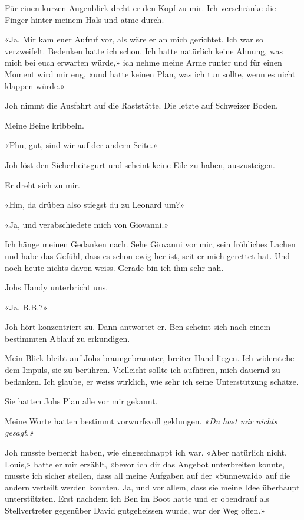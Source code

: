 Für einen kurzen Augenblick dreht er den Kopf zu mir. Ich verschränke
die Finger hinter meinem Hals und atme durch.

«Ja. Mir kam euer Aufruf vor, als wäre er an mich gerichtet. Ich war so
verzweifelt. Bedenken hatte ich schon. Ich hatte natürlich keine Ahnung,
was mich bei euch erwarten würde,» ich nehme meine Arme runter und für
einen Moment wird mir eng, «und hatte keinen Plan, was ich tun sollte,
wenn es nicht klappen würde.»

Joh nimmt die Ausfahrt auf die Raststätte. Die letzte auf Schweizer
Boden.

Meine Beine kribbeln.

«Phu, gut, sind wir auf der andern Seite.»

Joh löst den Sicherheitsgurt und scheint keine Eile zu haben,
auszusteigen.

Er dreht sich zu mir.

«Hm, da drüben also stiegst du zu Leonard um?»

«Ja, und verabschiedete mich von Giovanni.»

Ich hänge meinen Gedanken nach. Sehe Giovanni vor mir, sein fröhliches
Lachen und habe das Gefühl, dass es schon ewig her ist, seit er mich
gerettet hat. Und noch heute nichts davon weiss. Gerade bin ich ihm sehr
nah.

Johs Handy unterbricht uns.

«Ja, B.B.?»

Joh hört konzentriert zu. Dann antwortet er. Ben scheint sich nach einem
bestimmten Ablauf zu erkundigen.

Mein Blick bleibt auf Johs braungebrannter, breiter Hand liegen. Ich
widerstehe dem Impuls, sie zu berühren. Vielleicht sollte ich aufhören,
mich dauernd zu bedanken. Ich glaube, er weiss wirklich, wie sehr ich
seine Unterstützung schätze.

Sie hatten Johs Plan alle vor mir gekannt.

Meine Worte hatten bestimmt vorwurfsvoll geklungen. \emph{«Du hast mir
nichts gesagt.»}

Joh musste bemerkt haben, wie eingeschnappt ich war. «Aber natürlich
nicht, Louis,» hatte er mir erzählt, «bevor ich dir das Angebot
unterbreiten konnte, musste ich sicher stellen, dass all meine Aufgaben
auf der «Sunnewaid» auf die andern verteilt werden konnten. Ja, und vor
allem, dass sie meine Idee überhaupt unterstützten. Erst nachdem ich Ben
im Boot hatte und er obendrauf als Stellvertreter gegenüber David
gutgeheissen wurde, war der Weg offen.»

